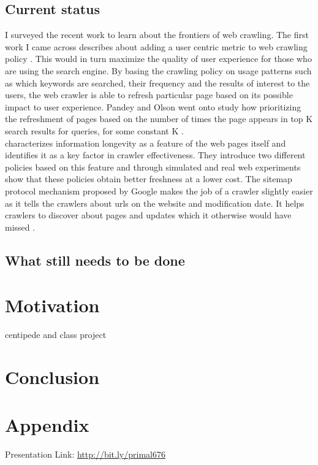 \documentclass[a4paper, 11pt]{article} %
\begin{document}
\subsection{Current status}

I surveyed the recent work to learn about the frontiers of web crawling. The first work I came across describes about adding a user centric metric to web crawling policy \cite{pandey2005user}. This would in turn maximize the quality of user experience for those who are using the search engine. By basing the crawling policy on usage patterns such as which keywords are searched, their frequency and the results of interest to the users, the web crawler is able to refresh particular page based on its possible impact to user experience. Pandey and Olson went onto study how prioritizing the refreshment of pages based on the number of times the page appears in top K search results for queries, for some constant K \cite{pandey2008crawl}. \\

\cite{olston2008recrawl} characterizes information longevity as a feature of the web pages itself and identifies it as a key factor in crawler effectiveness. They introduce two different policies based on this feature and through simulated and real web experiments show that these policies obtain better freshness at a lower cost. The sitemap protocol mechanism proposed by Google makes the job of a crawler slightly easier as it tells the crawlers about urls on the website and modification date. It helps crawlers to discover about pages and updates which it otherwise would have missed \cite{google2014sitemap}. 

\subsection{What still needs to be done}


\section{Motivation}

centipede and class project

\section{Conclusion}

\section*{Appendix}

Presentation Link: \url{http://bit.ly/primal676}







\end{document}
